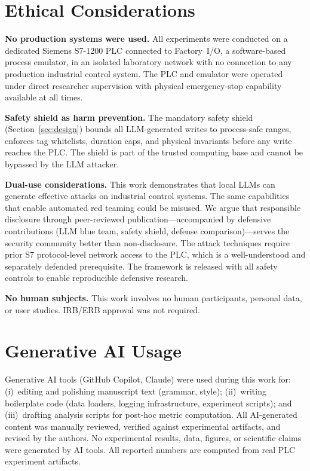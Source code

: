 \documentclass[sigconf,anonymous]{acmart} %
\begin{document}
\section{Ethical Considerations}
\label{sec:appendix:ethics}

\textbf{No production systems were used.} All experiments were conducted on a dedicated Siemens S7-1200 PLC connected to Factory~I/O, a software-based process emulator, in an isolated laboratory network with no connection to any production industrial control system. The PLC and emulator were operated under direct researcher supervision with physical emergency-stop capability available at all times.

\textbf{Safety shield as harm prevention.} The mandatory safety shield (Section~\ref{sec:design}) bounds all LLM-generated writes to process-safe ranges, enforces tag whitelists, duration caps, and physical invariants before any write reaches the PLC. The shield is part of the trusted computing base and cannot be bypassed by the LLM attacker.

\textbf{Dual-use considerations.} This work demonstrates that local LLMs can generate effective attacks on industrial control systems. The same capabilities that enable automated red teaming could be misused. We argue that responsible disclosure through peer-reviewed publication---accompanied by defensive contributions (LLM blue team, safety shield, defense comparison)---serves the security community better than non-disclosure. The attack techniques require prior S7 protocol-level network access to the PLC, which is a well-understood and separately defended prerequisite. The framework is released with all safety controls to enable reproducible defensive research.

\textbf{No human subjects.} This work involves no human participants, personal data, or user studies. IRB/ERB approval was not required.

\section{Generative AI Usage}
\label{sec:appendix:ai}

Generative AI tools (GitHub Copilot, Claude) were used during this work for: (i)~editing and polishing manuscript text (grammar, style); (ii)~writing boilerplate code (data loaders, logging infrastructure, experiment scripts); and (iii)~drafting analysis scripts for post-hoc metric computation. All AI-generated content was manually reviewed, verified against experimental artifacts, and revised by the authors. No experimental results, data, figures, or scientific claims were generated by AI tools. All reported numbers are computed from real PLC experiment artifacts.


\end{document}
